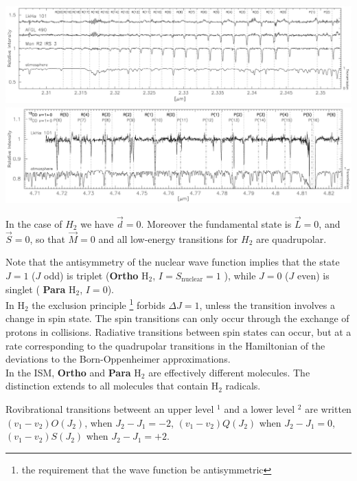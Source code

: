 \begin{center}
\includegraphics[width=27cm,height=!]{./B/CO_subaru_1.jpg}
\includegraphics[width=27cm,height=!]{./B/CO_subaru_2.jpg}
\end{center}
\vfill




In the case of $H_2$ we have $\vec{d}=0$. Moreover the fundamental
 state is $\vec{L} = 0$, and $\vec{S}=0$, so that $\vec{M}=0$ and all
 low-energy transitions for  $H_2$ are quadrupolar.

Note that the antisymmetry of the nuclear wave function implies that
the state $J=1$ ($J$ odd) is triplet ({\bf Ortho } H$_2$, $I =
S_\mathrm{nuclear} = 1$ ), while $J=0$ ($J$ even) is singlet ({\bf
Para } H$_2$, $I = 0$).\\


In H$_2$ the exclusion principle \footnote{the requirement that the
  wave function be antisymmetric} forbids $\Delta J = 1$, unless the
transition involves a change in spin state. The spin transitions can
only occur through the exchange of protons in collisions. Radiative
transitions between spin states can occur, but at a rate corresponding
to the quadrupolar transitions in the Hamiltonian of the deviations to
the Born-Oppenheimer approximations. \\

In the ISM, {\bf Ortho } and {\bf Para } H$_2$ are effectively
different molecules. The distinction extends to all molecules that
contain H$_2$ radicals.

Rovibrational transitions betweent an upper level $^1$ and a lower
level $^2$ are written $(v_1-v_2)O(J_2)$, when $J_2-J_1 = -2$,
$(v_1-v_2)Q(J_2)$ when $J_2-J_1 = 0$, $(v_1-v_2)S(J_2)$ when $J_2-J_1
= +2$.



